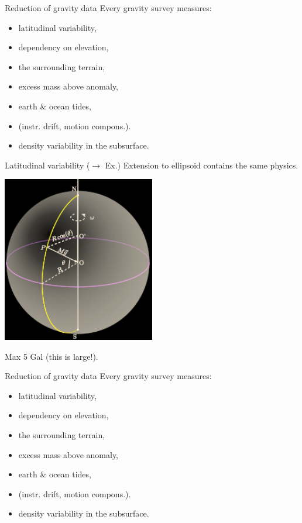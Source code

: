 \begin{frame}
  \begin{PointSix}{Reduction of gravity data}
    Every gravity survey measures:
    \begin{itemize}
      \item latitudinal variability,
      \item dependency on elevation,
      \item the surrounding terrain,
      \item excess mass above anomaly,
      \item earth \& ocean tides,
      \item (instr. drift, motion compons.).
      \item \alert{density variability in the subsurface.}
    \end{itemize}
  \end{PointSix}
\end{frame}

\begin{frame}
  \begin{PointSix}{Latitudinal variability ($\rightarrow$ Ex.)}
    \small  Extension to ellipsoid contains the same physics.
    \begin{center}
    \includegraphics[width=0.5\textwidth]{Figures/Gravity/Exported/GravityFieldEarthRotation_Reversed.png}
    \end{center}
    \small Max 5 Gal (this is large!).
  \end{PointSix}
\end{frame}

\begin{frame}
  \begin{PointSix}{Reduction of gravity data}
    Every gravity survey measures:
    \begin{itemize}
      \item \textcolor{MyBlue}{latitudinal variability},
      \item dependency on elevation,
      \item the surrounding terrain,
      \item excess mass above anomaly,
      \item earth \& ocean tides,
      \item (instr. drift, motion compons.).
      \item \alert{density variability in the subsurface.}
    \end{itemize}
  \end{PointSix}
\end{frame}

